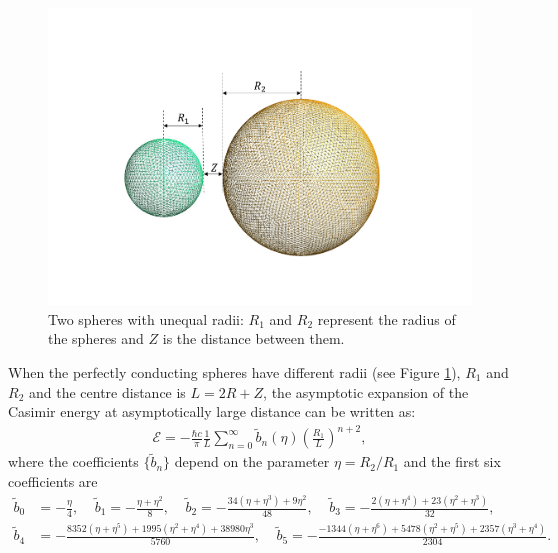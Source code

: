 \begin{figure}[H]
    \hspace*{2cm}\includegraphics[scale = 0.6]{figures/Grid_two_spheres_unequal_radii.png}
    \caption{Two spheres with unequal radii: $R_{1}$ and $R_{2}$ represent the radius of the spheres and $Z$ is the distance between them.}
    \label{Two spheres with unequal radii}
\end{figure}

When the perfectly conducting spheres have different radii (see Figure \ref{Two spheres with unequal radii}), $R_{1}$ and $R_{2}$ and the centre distance 
is $L = 2R+Z$, the asymptotic expansion of the Casimir energy at asymptotically large distance can be written as:
\begin{align}\label{Asymptotic unequal radii}
    \mathcal{E} = -\frac{\hbar c}{\pi}\frac{1}{L}\sum_{n=0}^{\infty}\tilde{b}_{n}(\eta)\left(\frac{R_{1}}{L}\right)^{n+2},
\end{align}
where the coefficients $\{\tilde{b}_{n}\}$ depend on the parameter $\eta = R_{2}/R_{1}$ and the first six coefficients are
\begin{align*}
    \tilde{b}_{0} &= -\frac{\eta}{4}, \ \ \ \ \ \tilde{b}_{1} = -\frac{\eta + \eta^{2}}{8}, \ \ \ \ \  \tilde{b}_{2} = -\frac{34(\eta+\eta^{3})+ 9\eta^{2}}{48}, \ \ \ \ \ \tilde{b}_{3} = -\frac{2(\eta+\eta^{4}) + 23(\eta^{2} + \eta^{3})}{32}, \\ 
    \tilde{b}_{4} &= -\frac{8352(\eta + \eta^{5})+ 1995(\eta^{2} + \eta^{4}) + 38980\eta^{3}}{5760}, \ \ \ \ \ \tilde{b}_{5} = -\frac{-1344(\eta+\eta^{6}) + 5478(\eta^{2} + \eta^{5})+2357(\eta^{3} + \eta^{4})}{2304}.
\end{align*}

